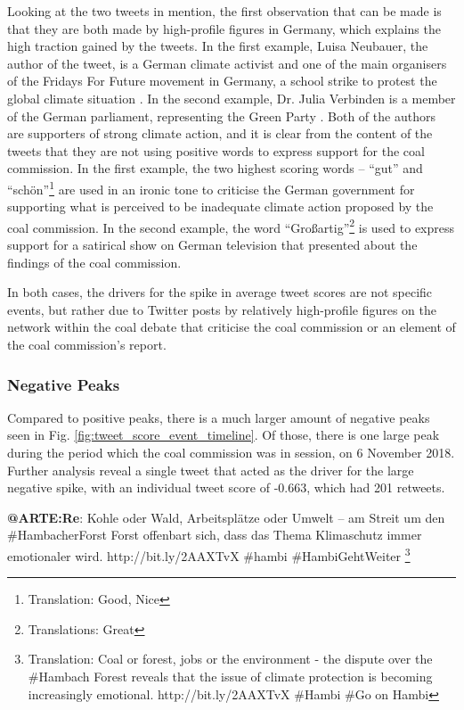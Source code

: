 \documentclass[12pt,onecolumn,twoside]{layout}
\begin{document}
Looking at the two tweets in mention, the first observation that can be made is that they are both made by high-profile figures in Germany, which explains the high traction gained by the tweets. In the first example, Luisa Neubauer, the author of the tweet, is a German climate activist and one of the main organisers of the Fridays For Future movement in Germany, a school strike to protest the global climate situation \citep{FF20, FF20G}. In the second example, Dr. Julia Verbinden is a member of the German parliament, representing the Green Party \citep{Bundestag2020}. Both of the authors are supporters of strong climate action, and it is clear from the content of the tweets that they are not using positive words to express support for the coal commission. In the first example, the two highest scoring words -- ``gut'' and ``schön''\footnote{Translation: Good, Nice} are used in an ironic tone to criticise the German government for supporting what is perceived to be inadequate climate action proposed by the coal commission. In the second example, the word ``Großartig''\footnote{Translations: Great} is used to express support for a satirical show on German television that presented about the findings of the coal commission.

In both cases, the drivers for the spike in average tweet scores are not specific events, but rather due to Twitter posts by relatively high-profile figures on the network within the coal debate that criticise the coal commission or an element of the coal commission's report.

\subsubsection*{Negative Peaks} %
Compared to positive peaks, there is a much larger amount of negative peaks seen in Fig. \ref{fig:tweet_score_event_timeline}. Of those, there is one large peak during the period which the coal commission was in session, on 6 November 2018. Further analysis reveal a single tweet that acted as the driver for the large negative spike, with an individual tweet score of -0.663, which had 201 retweets.

\begin{displayquote}
	\textbf{@ARTE:Re}: Kohle oder Wald, Arbeitsplätze oder Umwelt – am Streit um den \#HambacherForst Forst offenbart sich, dass das Thema Klimaschutz immer emotionaler wird. http://bit.ly/2AAXTvX \#hambi \#HambiGehtWeiter
	\footnote{Translation: Coal or forest, jobs or the environment - the dispute over the \#Hambach Forest reveals that the issue of climate protection is becoming increasingly emotional. http://bit.ly/2AAXTvX \#Hambi \#Go on Hambi}
\end{displayquote}
\end{document}
